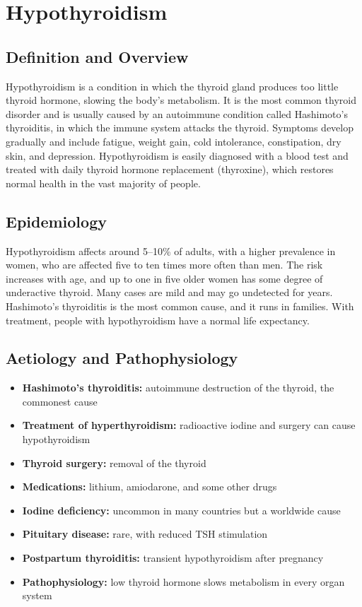 \chapter{Hypothyroidism}

\section*{Definition and Overview}
Hypothyroidism is a condition in which the thyroid gland produces too little thyroid hormone, slowing the body's metabolism. It is the most common thyroid disorder and is usually caused by an autoimmune condition called Hashimoto's thyroiditis, in which the immune system attacks the thyroid. Symptoms develop gradually and include fatigue, weight gain, cold intolerance, constipation, dry skin, and depression. Hypothyroidism is easily diagnosed with a blood test and treated with daily thyroid hormone replacement (thyroxine), which restores normal health in the vast majority of people.

\section*{Epidemiology}
Hypothyroidism affects around 5--10\% of adults, with a higher prevalence in women, who are affected five to ten times more often than men. The risk increases with age, and up to one in five older women has some degree of underactive thyroid. Many cases are mild and may go undetected for years. Hashimoto's thyroiditis is the most common cause, and it runs in families. With treatment, people with hypothyroidism have a normal life expectancy.

\section*{Aetiology and Pathophysiology}
\begin{itemize}
    \item \textbf{Hashimoto's thyroiditis:} autoimmune destruction of the thyroid, the commonest cause
    \item \textbf{Treatment of hyperthyroidism:} radioactive iodine and surgery can cause hypothyroidism
    \item \textbf{Thyroid surgery:} removal of the thyroid
    \item \textbf{Medications:} lithium, amiodarone, and some other drugs
    \item \textbf{Iodine deficiency:} uncommon in many countries but a worldwide cause
    \item \textbf{Pituitary disease:} rare, with reduced TSH stimulation
    \item \textbf{Postpartum thyroiditis:} transient hypothyroidism after pregnancy
    \item \textbf{Pathophysiology:} low thyroid hormone slows metabolism in every organ system
\end{itemize}

